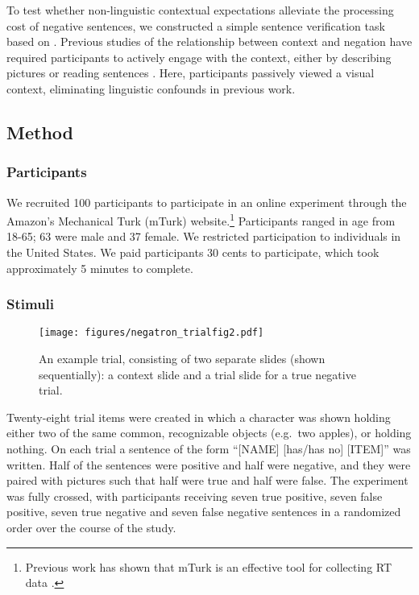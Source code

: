\documentclass[man]{apa2}
\begin{document}
To test whether non-linguistic contextual expectations alleviate the processing cost of negative sentences, we constructed a simple sentence verification task based on .  Previous studies of the relationship between context and negation have required participants to actively engage with the context, either by describing pictures \cite{wason1965} or reading sentences \cite{glenberg1999}.  Here, participants passively viewed a visual context, eliminating linguistic confounds in previous work.  

\subsection{Method}

\subsubsection{Participants}

We recruited 100 participants to participate in an online experiment through the Amazon's Mechanical Turk (mTurk) website.\footnote{Previous work has shown that mTurk is an effective tool for collecting RT data \cite{crump2013}.}  Participants ranged in age from 18-65; 63 were male and 37 female.  We restricted participation to individuals in the United States. We paid participants 30 cents to participate, which took approximately 5 minutes to complete.  

\subsubsection{Stimuli}

\begin{figure}[t]
\begin{center} 
\texttt{[image: figures/negatron\_trialfig2.pdf]}
\caption{\label{fig:trial} An example trial, consisting of two separate slides (shown sequentially): a context slide and a trial slide for a true negative trial. }
\vspace{-5mm}
\end{center} 
\end{figure}

Twenty-eight trial items were created in which a character was shown holding either two of the same common, recognizable objects (e.g.\ two apples), or holding nothing.  On each trial a sentence of the form ``[NAME] [has/has no] [ITEM]'' was written.  Half of the sentences were positive and half were negative, and they were paired with pictures such that half were true and half were false.  The experiment was fully crossed, with participants receiving seven true positive, seven false positive, seven true negative and seven false negative sentences in a randomized order over the course of the study.  
\end{document}
